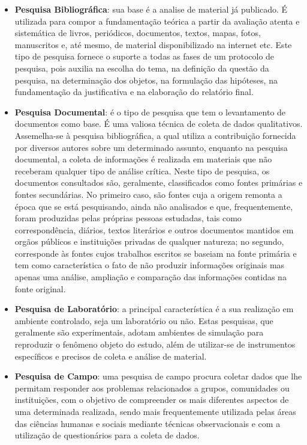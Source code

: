 \begin{itemize}
\item \textbf{Pesquisa Bibliográfica}: sua base é a analise de material já publicado. É utilizada para compor a fundamentação teórica a partir da avaliação atenta e sistemática de livros, periódicos, documentos, textos, mapas, fotos, manuscritos e, até mesmo, de material disponibilizado na internet etc. Este tipo de pesquisa fornece o suporte a todas as fases de um protocolo de pesquisa, pois auxilia na escolha do tema, na definição da questão da pesquisa, na determinação dos objetos, na formulação das hipóteses, na fundamentação da justificativa e na elaboração do relatório final.
\item \textbf{Pesquisa Documental}: é o tipo de pesquisa que tem o levantamento de documentos como base. É uma valiosa técnica de coleta de dados qualitativos. Assemelha-se à pesquisa bibliográfica, a qual utiliza a contribuição fornecida por diversos autores sobre um determinado assunto, enquanto na pesquisa documental, a coleta de informações é realizada em materiais que não receberam qualquer tipo de análise crítica. Neste tipo de pesquisa, os documentos consultados são, geralmente, classificados  como fontes primárias e fontes secundárias. No primeiro caso, são fontes cuja a origem remonta a época que se está pesquisando, ainda não analisados e que, frequentemente, foram produzidas pelas próprias pessoas estudadas, tais como correspondência, diários, textos literários e outros documentos mantidos em orgãos públicos e instituições privadas de qualquer natureza; no segundo, corresponde às fontes cujos trabalhos escritos se baseiam na fonte primária e tem como característica o fato de não produzir informações originais mas apenas uma análise, ampliação e comparação das informações contidas na fonte original.
\item \textbf{Pesquisa de Laboratório}: a principal característica é a sua realização em ambiente controlado, seja um laboratório ou não. Estas pesquisas, que geralmente são experimentais, adotam ambientes de simulação para reproduzir o fenômeno objeto do estudo, além de utilizar-se de instrumentos específicos e precisos de coleta e análise de material.
\item \textbf{Pesquisa de Campo}: uma pesquisa de campo procura coletar dados que lhe permitam responder aos problemas relacionados a grupos, comunidades ou instituições, com o objetivo de compreender os mais diferentes aspectos de uma determinada realizada, sendo mais frequentemente utilizada pelas áreas das ciências humanas e sociais mediante técnicas observacionais e com a utilização de questionários para a coleta de dados. 
\end{itemize}

